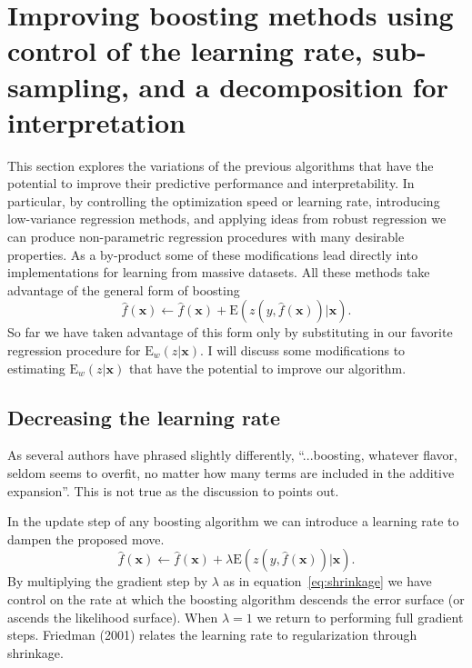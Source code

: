 \documentclass{article}
\newcommand{\EV}{\mathrm{E}}
\begin{document}
\section{Improving boosting methods using control of the learning rate, sub-sampling, and a decomposition for interpretation} \label{GBMModifications}

This section explores the variations of the previous algorithms that
have the potential to improve their predictive performance and
interpretability. In particular, by controlling the optimization speed
or learning rate, introducing low-variance regression methods, and
applying ideas from robust regression we can produce non-parametric
regression procedures with many desirable properties. As a by-product
some of these modifications lead directly into implementations for
learning from massive datasets. All these methods take advantage of
the general form of boosting
\begin{equation} 
\hat f(\mathbf{x}) \leftarrow \hat f(\mathbf{x}) + \EV(z(y,\hat f(\mathbf{x}))|\mathbf{x}). 
\end{equation}
So far we have taken advantage of this form only by substituting in
our favorite regression procedure for $\EV_w(z|\mathbf{x})$. I will
discuss some modifications to estimating $\EV_w(z|\mathbf{x})$ that
have the potential to improve our algorithm.

\subsection{Decreasing the learning rate}
As several authors have phrased slightly differently, ``...boosting,
whatever flavor, seldom seems to overfit, no matter how many terms are
included in the additive expansion''. This is not true as the
discussion to \cite{FHT:2000} points out.

In the update step of any boosting algorithm we can introduce a
learning rate to dampen the proposed move.
\begin{equation} 
\label{eq:shrinkage} 
\hat f(\mathbf{x}) \leftarrow \hat f(\mathbf{x}) + \lambda \EV(z(y,\hat f(\mathbf{x}))|\mathbf{x}). 
\end{equation} 
By multiplying the gradient step by $\lambda$ as in
equation~\ref{eq:shrinkage} we have control on the rate at which the
boosting algorithm descends the error surface (or ascends the
likelihood surface). When $\lambda=1$ we return to performing full
gradient steps. Friedman (2001) relates the learning rate to
regularization through shrinkage.
\end{document}
